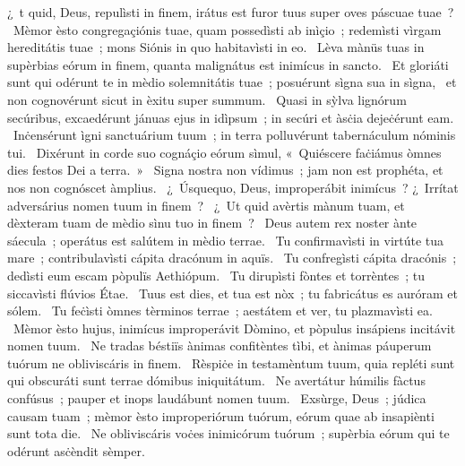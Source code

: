 \psalmChapterWithInscription{}
{ }
{%
¿~t quid, Deus, repulìsti in finem, irátus est furor tuus super oves páscuae tuae~? 
~Mèmor èsto congregaçiónis tuae, quam possedìsti ab inìçio~; redemìsti vìrgam hereditátis tuae~; mons Siónis in quo habitavìsti in eo. 
~Lèva mànüs tuas in supèrbias eórum in finem, quanta malignátus est inimícus in sancto. 
~Et gloriáti sunt qui odérunt te in mèdio solemnitátis tuae~; posuérunt sìgna sua in sìgna, 
~et non cognovérunt sicut in èxitu super summum. 
~Quasi in sỳlva lignórum secúribus, excaedérunt jánuas ejus in idìpsum~; in secúri et àsċia dejeċérunt eam. 
~Inċensérunt ìgni sanctuárium tuum~; in terra polluvérunt tabernáculum nóminis tui. 
~Dixérunt in corde suo cognáçio eórum sìmul, «~Quiéscere faċiámus òmnes dies festos Dei a terra.~»
~Signa nostra non vídimus~; jam non est prophéta, et nos non cognóscet àmplius. 
~¿~Úsquequo, Deus, improperábit inimícus~? ¿~Irrítat adversárius nomen tuum in finem~? 
~¿~Ut quid avèrtis mànum tuam, et dèxteram tuam de mèdio sìnu tuo in finem~? 
~Deus autem rex noster ànte sáecula~; operátus est salútem in mèdio terrae. 
~Tu confirmavìsti in virtúte tua mare~; contribulavìsti cápita dracónum in aquïs. 
~Tu confregìsti cápita dracónis~; dedìsti eum escam pòpulïs Aethiópum. 
~Tu dirupìsti fòntes et torrèntes~; tu siccavìsti flúvios Étae. 
~Tuus est dies, et tua est nòx~; tu fabricátus es auróram et sólem. 
~Tu feċìsti òmnes tèrminos terrae~; aestátem et ver, tu plazmavìsti ea. 
~Mèmor èsto hujus, inimícus improperávit Dòmino, et pòpulus insápiens incitávit nomen tuum. 
~Ne tradas béstiïs ànimas confitèntes tìbi, et ànimas páuperum tuórum ne obliviscáris in finem. 
~Rèspiċe in testamèntum tuum, quia repléti sunt qui obscuráti sunt terrae dómibus iniquitátum. 
~Ne avertátur húmilis fàctus confúsus~; pauper et inops laudábunt nomen tuum. 
~Exsùrge, Deus~; júdica causam tuam~; mèmor èsto improperiórum tuórum, eórum quae ab insapiènti sunt tota die. 
~Ne obliviscáris voċes inimicórum tuórum~; supèrbia eórum qui te odérunt asċèndit sèmper. 
}

